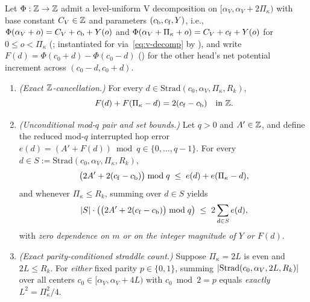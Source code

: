 \begin{theorem}\label{thm:Vstar}
Let $\Phi : \mathbb{Z} \to \mathbb{Z}$ admit a level-uniform V decomposition on $[\alpha_V, \alpha_V + 2\Pi_\kappa)$ with base constant
$C_V \in \mathbb{Z}$ and parameters $(c_{\mathrm{b}}, c_{\mathrm{f}}, Y)$, i.e., $\Phi(\alpha_V + o) = C_V + c_{\mathrm{b}} + Y(o)$ and
$\Phi(\alpha_V + \Pi_\kappa + o) = C_V + c_{\mathrm{f}} + Y(o)$ for $0 \le o < \Pi_\kappa$ (;
instantiated for  via~\eqref{eq:v-decomp} by ), and write
$F(d) = \Phi(c_0 + d) - \Phi(c_0 - d)$ () for the other head's net potential increment across
$(c_0 - d, c_0 + d)$.
\begin{enumerate}
\item \emph{(Exact $\mathbb{Z}$-cancellation.)} For every $d \in \mathrm{Strad}(c_0, \alpha_V, \Pi_\kappa, R_k)$,
  \[
    F(d) + F(\Pi_\kappa - d) = 2(c_{\mathrm{f}} - c_{\mathrm{b}}) \quad\text{in }\mathbb{Z}.
  \]
\item \emph{(Unconditional mod-$q$ pair and set bounds.)} Let $q > 0$ and $A' \in \mathbb{Z}$, and define the reduced mod-$q$
  interrupted hop error $e(d) = (A' + F(d)) \bmod q \in \{0, \dots, q - 1\}$. For every $d \in S := \mathrm{Strad}(c_0,
  \alpha_V, \Pi_\kappa, R_k)$,
  \begin{equation}\label{eq:vstar-pair}
    \bigl(2 A' + 2(c_{\mathrm{f}} - c_{\mathrm{b}})\bigr) \bmod q \;\le\; e(d) + e(\Pi_\kappa - d),
  \end{equation}
  and whenever $\Pi_\kappa \le R_k$, summing over $d \in S$ yields
  \begin{equation}\label{eq:vstar-sum}
    \lvert S \rvert \cdot \bigl(\bigl(2 A' + 2(c_{\mathrm{f}} - c_{\mathrm{b}})\bigr) \bmod q\bigr) \;\le\; 2 \sum_{d \in S} e(d),
  \end{equation}
  with \emph{zero dependence on $m$ or on the integer magnitude of $Y$ or $F(d)$}.
\item \emph{(Exact parity-conditioned straddle count.)} Suppose $\Pi_\kappa = 2L$ is even and $2L \le R_k$. For \emph{either}
  fixed parity $p \in \{0, 1\}$, summing $\lvert \mathrm{Strad}(c_0, \alpha_V, 2L, R_k) \rvert$ over all centers $c_0 \in
  [\alpha_V, \alpha_V + 4L)$ with $c_0 \bmod 2 = p$ equals \emph{exactly} $L^2 = \Pi_\kappa^2 / 4$.
\end{enumerate}
\end{theorem}

